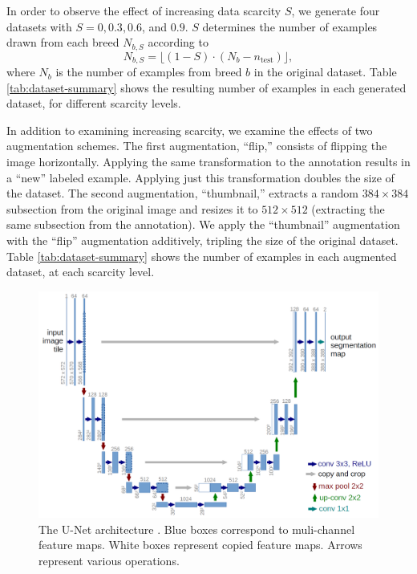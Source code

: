 \documentclass[10pt, journal]{IEEEtran}
\begin{document}
In order to observe the effect of increasing data scarcity $S$, we generate four
datasets with $S = 0, 0.3, 0.6$, and $0.9$. $S$ determines the number of
examples drawn from each breed $N_{b,S}$ according to
\[ N_{b,S} = \lfloor(1 - S) \cdot (N_b - n_{\text{test}})\rfloor, \] where $N_b$
is the number of examples from breed $b$ in the original dataset. Table
\ref{tab:dataset-summary} shows the resulting number of examples in each
generated dataset, for different scarcity levels.

In addition to examining increasing scarcity, we examine the effects of two
augmentation schemes. The first augmentation, ``flip,'' consists of flipping the
image horizontally. Applying the same transformation to the annotation results
in a ``new'' labeled example. Applying just this transformation doubles the size
of the dataset. The second augmentation, ``thumbnail,'' extracts a random
$384\times 384$ subsection from the original image and resizes it to
$512\times 512$ (extracting the same subsection from the annotation). We apply
the ``thumbnail'' augmentation with the ``flip'' augmentation additively,
tripling the size of the original dataset. Table \ref{tab:dataset-summary} shows
the number of examples in each augmented dataset, at each scarcity level.

\begin{figure}
  \centering
  \includegraphics[width=\linewidth]{u-net-architecture}
  \caption[unet]{The U-Net architecture \cite{ronneberger_u-net:_2015}. Blue
    boxes correspond to muli-channel feature maps. White boxes represent copied
    feature maps. Arrows represent various operations.}
  \label{fig:unet}
\end{figure}
\end{document}
